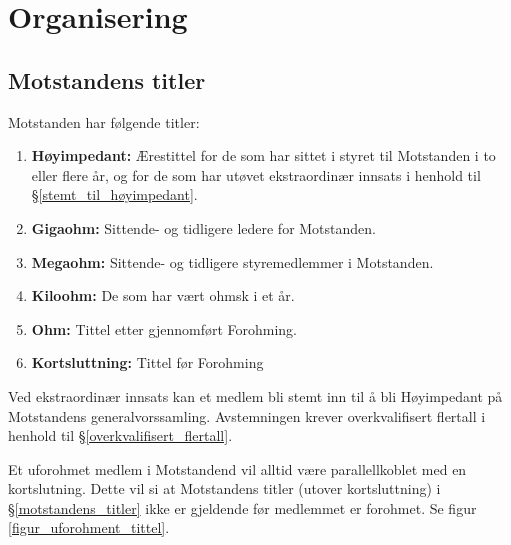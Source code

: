    
\section{Organisering}
    \subsection{Motstandens titler}
        \begin{statute}[\label{motstandens_titler}]
            Motstanden har følgende titler:
            \begin{enumerate}[font = \bfseries]
                \item \textbf{Høyimpedant:} Ærestittel for de som har sittet i styret til Motstanden i to eller flere år, og for de som har utøvet ekstraordinær innsats i henhold til \S\hspace{3pt}\ref{stemt_til_høyimpedant}.
                \item \textbf{Gigaohm:} Sittende- og tidligere ledere for Motstanden.
                \item \textbf{Megaohm:} Sittende- og tidligere styremedlemmer i Motstanden.
                \item \textbf{Kiloohm:} De som har vært ohmsk i et år.
                \item \textbf{Ohm:} Tittel etter gjennomført Forohming.
                \item \textbf{Kortsluttning:} Tittel før Forohming
            \end{enumerate}
        \end{statute}
        \begin{statute}[\label{stemt_til_høyimpedant}]
            Ved ekstraordinær innsats kan et medlem bli stemt inn til å bli Høyimpedant på Motstandens generalvorssamling. Avstemningen krever overkvalifisert flertall i henhold til \S\hspace{3pt}\ref{overkvalifisert_flertall}.
        \end{statute}
        \begin{statute}[\label{statutt_uforohmet_tittel}]
            Et uforohmet medlem i Motstandend vil alltid være parallellkoblet med en kortslutning. Dette vil si at Motstandens titler (utover kortsluttning) i \S\hspace{3pt}\ref{motstandens_titler} ikke er gjeldende før medlemmet er forohmet. Se figur \ref{figur_uforohment_tittel}.
        \end{statute}
    
